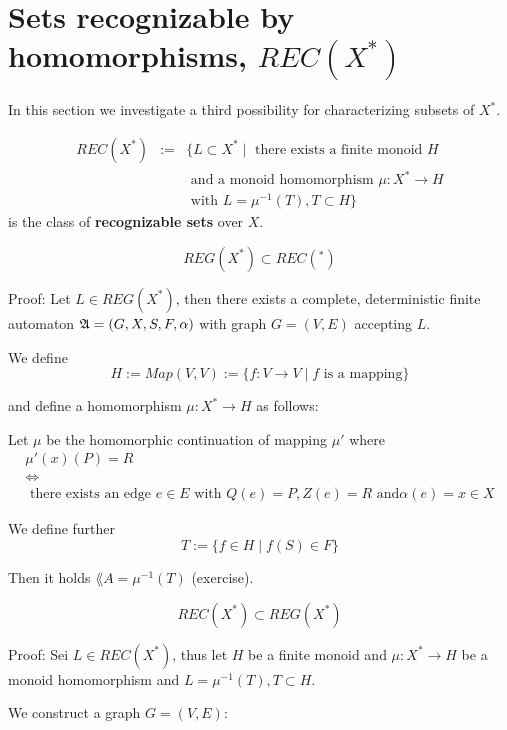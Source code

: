 \section{Sets recognizable by homomorphisms, $REC(X^*)$}

In this section we investigate a third possibility for characterizing subsets of
$X^*$.

\begin{definition}
\begin{eqnarray*}
 REC(X^*) & := & \{ L \subset X^* \mid \mbox{ there exists a
finite monoid } H \\
& & \mbox{ and a monoid homomorphism }\mu : X^* \to H \\
& & \mbox{ with } L = \mu^{-1}(T), T \subset H \}
\end{eqnarray*}
is the class of {\bf recognizable sets} over $X$.
\end{definition}

\begin{lemma}
\[ REG(X^*) \subset REC(^*) \]
\end{lemma}

Proof: Let $L \in REG(X^*)$, then there exists a complete, deterministic finite
automaton $\mbox{$\mathfrak{A}$} = (G, X, S, F, \alpha)$ with graph $G = (V, E)$ accepting $L$.

We define \[ H := Map(V,V) := \{ f : V \to V \mid f \mbox{ is a mapping} \} \]

and define a homomorphism $\mu : X^* \to H$ as follows:

Let $\mu$ be the homomorphic continuation of mapping $\mu'$ where
\begin{eqnarray*}
& \mu'(x)(P) = R & \\
& \Leftrightarrow & \\
& \mbox{ there exists an edge }e \in E\mbox{ with }Q(e) = P, Z(e) = R\mbox{ and
}\alpha(e) = x \in X &
\end{eqnarray*}

We define further \[ T := \{ f \in H \mid f(S) \in F \} \]

Then it holds $\lang{A} = \mu^{-1}(T)$ (exercise).

\begin{lemma}
\[ REC(X^*) \subset REG(X^*) \]
\end{lemma}

Proof: Sei $L \in REC(X^*)$, thus let $H$ be a finite monoid and $\mu : X^* \to
H$ be a monoid homomorphism and $L = \mu^{-1}(T), T \subset H$.

We construct a graph $G = (V, E)$:

